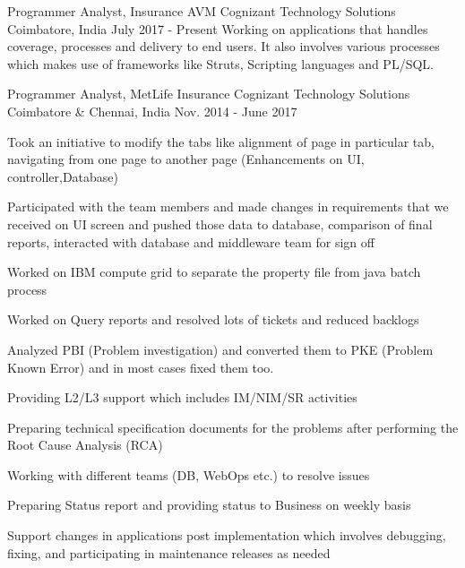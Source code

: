 

\begin{cventries}

  \cventry
    {Programmer Analyst, Insurance AVM} %
    {Cognizant Technology Solutions} %
    {Coimbatore, India} %
    {July 2017 - Present} %
    {
    Working on applications that handles coverage, processes and delivery to end users. It also involves various processes which makes use of frameworks like Struts, Scripting languages and PL/SQL.
    }

  \cventry
    {Programmer Analyst, MetLife Insurance} %
    {Cognizant Technology Solutions} %
    {Coimbatore \& Chennai, India} %
    {Nov. 2014 - June 2017} %
    {
      \begin{cvitems}
        \item{Took an initiative to modify the tabs like alignment of page in particular tab, navigating from one page to another page (Enhancements on UI, controller,Database)}
        \item{Participated with the team members and made changes in requirements that we received on UI screen and pushed those data to database, comparison of final reports, interacted with database and middleware team for sign off}
        \item{Worked on IBM compute grid to separate the property file from java batch process}
        \item{Worked on Query reports and resolved lots of tickets and reduced backlogs}
        \item{Analyzed PBI (Problem investigation) and converted them to PKE (Problem Known Error) and in most cases fixed them too.}
        \item{Providing L2/L3 support which includes IM/NIM/SR activities}
        \item{Preparing technical specification documents for the problems after performing the Root Cause Analysis (RCA)}
        \item{Working with different teams (DB, WebOps etc.) to resolve issues}
        \item{Preparing Status report and providing status to Business on weekly basis}
        \item{Support changes in applications post implementation which involves debugging, fixing, and participating in maintenance releases as needed}
      \end{cvitems}
    }

\end{cventries}

